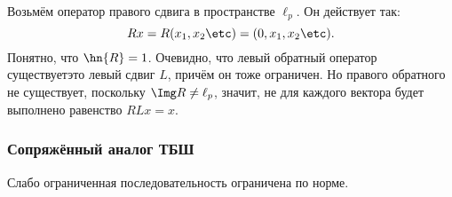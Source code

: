 \documentclass[a4paper]{article}
\begin{document}
\begin{ex}
Возьмём оператор правого сдвига в пространстве $\ell_p$. Он действует так:
$$Rx = R(x_1,x_2\etc) = (0,x_1,x_2\etc).$$
Понятно, что $\hn{R} = 1$. Очевидно, что левый обратный оператор существует\т это левый сдвиг $L$,
причём он тоже ограничен. Но правого обратного не существует, поскольку $\Img R \neq \ell_p$, значит,
не для каждого вектора будет выполнено равенство $R L x=x$.
\end{ex}


\subsubsection{Сопряжённый аналог ТБШ}
\label{sssec:adjoint.banach-shteinhouse}

\begin{theorem}
Слабо ограниченная последовательность ограничена по норме.
\end{theorem}
\end{document}
